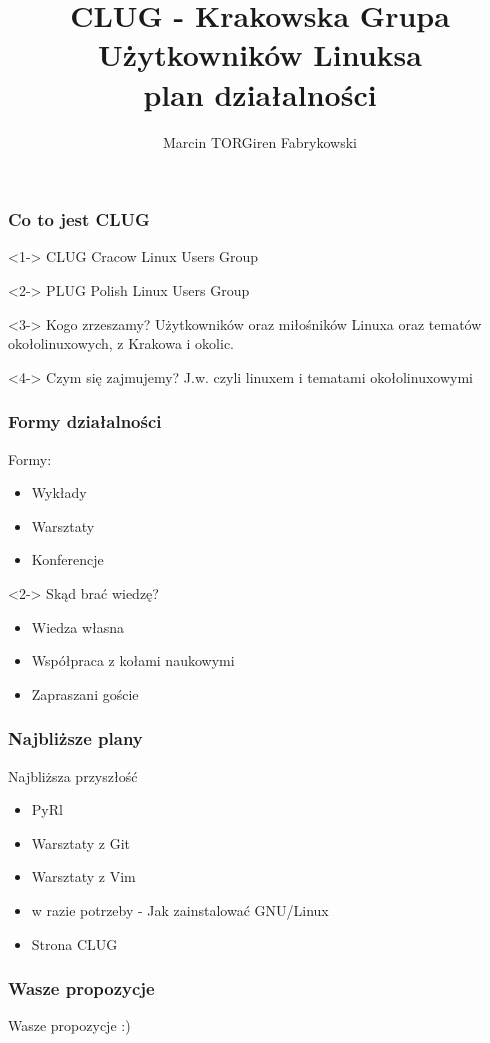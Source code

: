 \documentclass[10pt]{beamer}
\author{Marcin TORGiren Fabrykowski}
\title{CLUG - Krakowska Grupa Użytkowników Linuksa\\
plan działalności}
\institute{AGH - University of Science and Technology}
\begin{document}
\begin{frame}
	\titlepage
\end{frame}
\begin{frame}
	\frametitle{Co to jest CLUG}
	\begin{block}<1->
		{CLUG}
		Cracow Linux Users Group
	\end{block}
	\begin{block}<2->
	{PLUG}
	Polish Linux Users Group
	\end{block}
	\begin{block}<3->
		{Kogo zrzeszamy?}
		Użytkowników oraz miłośników Linuxa oraz tematów okołolinuxowych, z Krakowa i okolic.
	\end{block}
	\begin{block}<4->
	{Czym się zajmujemy?}
	J.w. czyli linuxem i tematami okołolinuxowymi
	\end{block}
\end{frame}
\begin{frame}
	\frametitle{Formy działalności}
	\begin{block}
		{Formy:}
		\begin{itemize}
			\item Wykłady
			\item Warsztaty
			\item Konferencje
		\end{itemize}
	\end{block}
	\begin{block}<2->
		{Skąd brać wiedzę?}
		\begin{itemize}
			\item Wiedza własna
			\item Współpraca z kołami naukowymi
			\item Zapraszani goście
		\end{itemize}
	\end{block}
\end{frame}
\begin{frame}
	\frametitle{Najbliższe plany}
	\begin{block}
		{Najbliższa przyszłość}
		\begin{itemize}[<+->]
			\item PyRl
			\item Warsztaty z Git
			\item Warsztaty z Vim
			\item w razie potrzeby - Jak zainstalować GNU/Linux
			\item \large{Strona CLUG}
		\end{itemize}
	\end{block}
\end{frame}
\begin{frame}
	\frametitle{Wasze propozycje}
	\LARGE{\centerline{Wasze propozycje :)}}
\end{frame}
\end{document}
